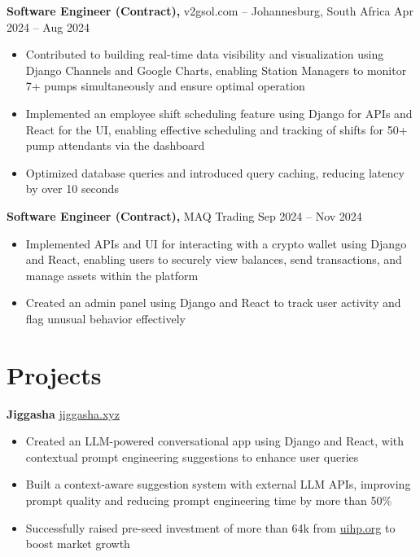 \documentclass[11pt]{article}       %
\begin{document}
\textbf{Software Engineer (Contract),} {v2gsol.com} -- Johannesburg, South Africa \hfill Apr 2024 -- Aug 2024 \\
\vspace{-9pt}
\begin{itemize}
    \item Contributed to building real-time data visibility and visualization using Django Channels and Google Charts, enabling Station Managers to monitor 7+ pumps simultaneously and ensure optimal operation
    \item Implemented an employee shift scheduling feature using Django for APIs and React for the UI, enabling effective scheduling and tracking of shifts for 50+ pump attendants via the dashboard
    \item Optimized database queries and introduced query caching, reducing latency by over 10 seconds
\end{itemize}

\textbf{Software Engineer (Contract),} {MAQ Trading} \hfill Sep 2024 -- Nov 2024 \\
\vspace{-9pt}
\begin{itemize}
    \item Implemented APIs and UI for interacting with a crypto wallet using Django and React, enabling users to securely view balances, send transactions, and manage assets within the platform
    \item Created an admin panel using Django and React to track user activity and flag unusual behavior effectively
\end{itemize}

\vspace{-18.5pt}

\section*{Projects}
\textbf{Jiggasha} \hfill \href{https://jiggasha.xyz}{jiggasha.xyz} \\
\vspace{-9pt}
\begin{itemize}
  \item Created an LLM-powered conversational app using Django and React, with contextual prompt engineering suggestions to enhance user queries
  \item Built a context-aware suggestion system with external LLM APIs, improving prompt quality and reducing prompt engineering time by more than 50\%
  \item Successfully raised pre-seed investment of more than 64k from \href{https://uihp.org}{uihp.org} to boost market growth 
\end{itemize}
\end{document}
